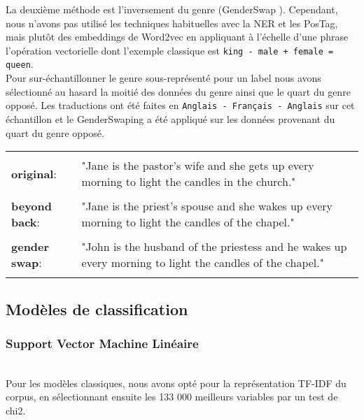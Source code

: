 La deuxième méthode est l'inversement du genre (GenderSwap ). Cependant, nous n'avons pas utilisé les techniques habituelles avec la NER et les PosTag, mais plutôt des embeddings de Word2vec en appliquant à l'échelle d'une phrase l'opération vectorielle dont l'exemple classique est \texttt{king - male + female = queen}.
\\
Pour sur-échantillonner le genre sous-représenté pour un label nous avons sélectionné au hasard la moitié des données du genre ainsi que le quart du genre opposé. Les traductions ont été faites en \texttt{Anglais - Français - Anglais} sur cet échantillon et le GenderSwaping a été appliqué sur les données provenant du quart du genre opposé.

\begin{longtable}{l p{4in}}
    &\\
    \textbf{original}: &"Jane is the pastor's wife and she gets up every morning to light the candles in the church." \\
    &\\
    \textbf{beyond back}: &"Jane is the priest's spouse and she wakes up every morning to light the candles of the chapel."\\
    &\\
    \textbf{gender swap}: &"John is the husband of the priestess and he wakes up every morning to light the candles of the chapel."\\
    &
\end{longtable}


\subsection{Modèles de classification}
\subsubsection{Support Vector Machine Linéaire}
\hfill\\
Pour les modèles classiques, nous avons opté pour la représentation TF-IDF du corpus, en sélectionnant ensuite les \textsf{133 000} meilleurs variables par un test de chi2.

